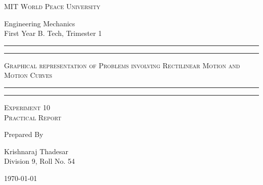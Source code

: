 \documentclass[11pt]{article}
\begin{document}
	
	\begin{titlepage} 
		\centering 
		
		
		\huge\textsc{
			MIT World Peace University
		}\\
	
		\vspace{0.75\baselineskip} %
		
		\LARGE{
			Engineering Mechanics\\
			First Year B. Tech, Trimester 1
		}
	
		
		\vfill %
		
		
		\rule{\textwidth}{1.6pt}\vspace*{-\baselineskip}\vspace*{2pt}
		\rule{\textwidth}{0.6pt}
		\vspace{0.75\baselineskip} %
		
		
		
		\huge{\textsc{
				Graphical representation of Problems involving Rectilinear Motion and Motion Curves
			}} \\
		
		
		
		\vspace{0.5\baselineskip} %
		\rule{\textwidth}{0.6pt}\vspace*{-\baselineskip}\vspace*{2.8pt}
		\rule{\textwidth}{1.6pt}
		
		\vspace{1\baselineskip} %

			
		\LARGE\textsc{
			Experiment 10\\
			Practical Report
		} %
		\vfill
		
		
		Prepared By
		\vspace{0.5\baselineskip} %
		
		\Large{
			Krishnaraj Thadesar \\
			Division 9, Roll No. 54
		}
		
		
		\vspace{0.5\baselineskip} %
		\today

	\end{titlepage}
	
\end{document}
